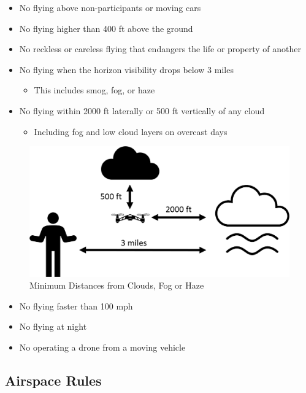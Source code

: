 \documentclass[
  12pt,
]{book}
\providecommand{\tightlist}{%
  \setlength{\itemsep}{0pt}\setlength{\parskip}{0pt}}
\begin{document}
\begin{itemize}
\tightlist
\item
  No flying above non-participants or moving cars
\item
  No flying higher than 400 ft above the ground
\item
  No reckless or careless flying that endangers the life or property of another
\item
  No flying when the horizon visibility drops below 3 miles

  \begin{itemize}
  \tightlist
  \item
    This includes smog, fog, or haze
  \end{itemize}
\item
  No flying within 2000 ft laterally or 500 ft vertically of any cloud

  \begin{itemize}
  \tightlist
  \item
    Including fog and low cloud layers on overcast days
  \end{itemize}
\end{itemize}

\begin{figure}

{\centering \includegraphics[width=0.7\linewidth]{images/cloud_distance} 

}

\caption{Minimum Distances from Clouds, Fog or Haze}\label{fig:cloud-distance}
\end{figure}

\begin{itemize}
\tightlist
\item
  No flying faster than 100 mph
\item
  No flying at night
\item
  No operating a drone from a moving vehicle
\end{itemize}

\hypertarget{airspace-rules}{%
\subsection{Airspace Rules}\label{airspace-rules}}
\end{document}
